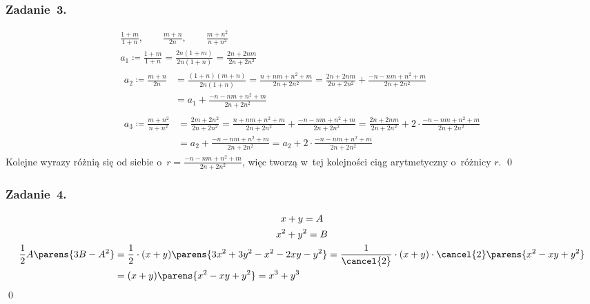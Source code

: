 \subsubsection*{Zadanie~3.}
\begin{gather*}
    \frac{1 + m}{1 + n}, \qquad \frac{m + n}{2n}, \qquad \frac{m + n^2}{n + n^2}\\
    a_1 \coloneqq \frac{1 + m}{1 + n} = \frac{2n(1 + m)}{2n(1 + n)} = \frac{2n + 2nm}{2n + 2n^2}\\
    \begin{split}
        a_2 \coloneqq \frac{m + n}{2n}
            &= \frac{(1 + n)(m + n)}{2n(1 + n)}
            = \frac{n + nm + n^2 + m}{2n + 2n^2}
            = \frac{2n + 2nm}{2n + 2n^2} + \frac{-n - nm + n^2 + m}{2n + 2n^2}\\
            &= a_1 + \frac{-n - nm + n^2 + m}{2n + 2n^2}
    \end{split}\\
    \begin{split}
        a_3 \coloneqq \frac{m + n^2}{n + n^2}
            &= \frac{2m + 2n^2}{2n + 2n^2}
            = \frac{n + nm + n^2 + m}{2n + 2n^2} + \frac{-n - nm + n^2 + m}{2n + 2n^2}
            = \frac{2n + 2nm}{2n + 2n^2} + 2 \cdot \frac{-n - nm + n^2 + m}{2n + 2n^2}\\
            &= a_2 + \frac{-n - nm + n^2 + m}{2n + 2n^2}
            = a_2 + 2 \cdot \frac{-n - nm + n^2 + m}{2n + 2n^2}
    \end{split}
\end{gather*}
Kolejne wyrazy różnią się od siebie o~\(r = \frac{-n - nm + n^2 + m}{2n + 2n^2}\), więc tworzą w~tej kolejności ciąg arytmetyczny o~różnicy \(r\).
\qed
\subsubsection*{Zadanie~4.}
\begin{gather*}
    x + y = A\\
    x^2 + y^2 = B\\
    \begin{split}
        \frac{1}{2}A\parens{3B - A^2}
            &= \frac{1}{2} \cdot (x + y) \parens{3x^2 + 3y^2 - x^2 - 2xy - y^2}
            = \frac{1}{\cancel{2}} \cdot (x + y) \cdot \cancel{2}\parens{x^2 - xy + y^2}\\
            &= (x + y)\parens{x^2 - xy + y^2}
            = x^3 + y^3
    \end{split}
\end{gather*}
\qed
